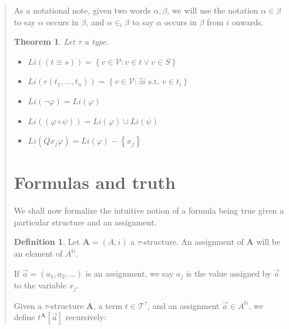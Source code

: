 \documentclass[a4paper, 12pt]{article}
\newtheorem{theorem}{Theorem}
\theoremstyle{definition}
\theoremstyle{definition}
\theoremstyle{definition}
\newtheorem{definition}{Definition}
\begin{document}
\begin{quote}
As a notational note, given two words $\alpha, \beta$, we will use the notation
$\alpha \in \beta$ to say $\alpha$ occurs in $\beta$, and $\alpha \in_i \beta$
to say $\alpha$ occurs in $\beta$ from $i$ onwards.

\begin{theorem}
    Let $\tau$ a type. 

    \begin{itemize}
        \item $Li\left( (t \equiv s) \right) = \left\{ v \in \mathcal{V} : v \in t \lor v \in S \right\} $
        \item $Li\left( r(t_1,\ldots,t_n) \right) = \left\{ v \in \mathcal{V} : \exists i \text{ s.t. } v \in t_i  \right\} $
        \item $Li(\neg \varphi) = Li(\varphi)$
        \item $Li \left( \left( \varphi \circ \psi \right)  \right) = Li(\varphi) \cup Li(\psi)$
        \item $Li \left( Qx_j \varphi \right) = Li(\varphi) - \left\{ x_j \right\}  $
    \end{itemize}
\end{theorem}

\pagebreak 

\section{Formulas and truth}

We shall now formalize the intuitive notion of a formula being true given 
a particular structure and an assignment.

\begin{definition}
    Let $\textbf{A} = (A, i)$ a $\tau$-structure. An assignment of $\textbf{A}$ will be 
    an element of $A^{\mathbb{N}}$.
\end{definition}

If $\overrightarrow{a} = (a_1, a_2, \ldots ) $ is an assignment, we say $a_j$
is the value assigned by $\overrightarrow{a}$ to the variable $x_j$.

Given a $\tau$-structure $\textbf{A}$, a term $t \in \mathcal{T}^\tau$, and 
an assignment $\overrightarrow{a} \in A^{\mathbb{N}}$, we define 
$t^{\textbf{A}}[\overrightarrow{a}]$ recursively: 


\end{quote}
\end{document}
